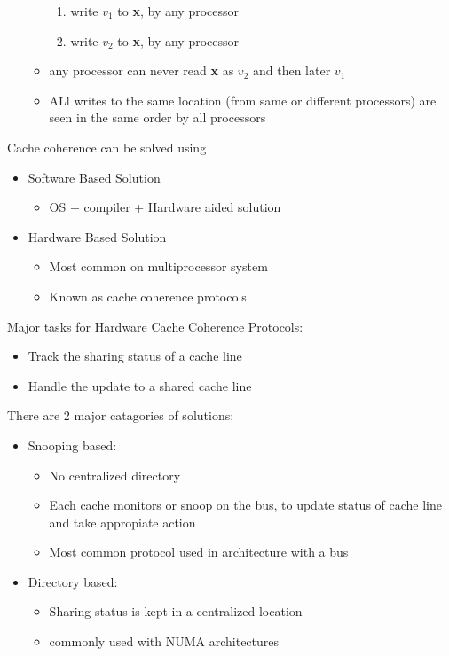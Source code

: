 \documentclass{article}
\begin{document}
\begin{itemize}
\begin{itemize}
\begin{enumerate}
                        \item write $v_1$ to \textbf{x}, by any processor
                        \item write $v_2$ to \textbf{x}, by any processor
                    \end{enumerate}
              \item any processor can never read \textbf{x} as $v_2$ and then later $v_1$
              \item ALl writes to the same location (from same or different processors) are seen in the same order by all processors
          \end{itemize}
\end{itemize}

Cache coherence can be solved using
\begin{itemize}
    \item Software Based Solution
          \begin{itemize}
              \item OS + compiler + Hardware aided solution
          \end{itemize}
    \item Hardware Based Solution
          \begin{itemize}
              \item Most common on multiprocessor system
              \item Known as cache coherence protocols
          \end{itemize}
\end{itemize}

Major tasks for Hardware Cache Coherence Protocols:
\begin{itemize}
    \item Track the sharing status of a cache line
    \item Handle the update to a shared cache line
\end{itemize}

There are 2 major catagories of solutions:
\begin{itemize}
    \item Snooping based:
          \begin{itemize}
              \item No centralized directory
              \item Each cache monitors or snoop on the bus, to update status  of cache line and take appropiate action
              \item Most common protocol used in architecture with a bus
          \end{itemize}
    \item Directory based:
          \begin{itemize}
              \item Sharing status is kept in a centralized location
              \item commonly used with NUMA architectures
          \end{itemize}
\end{itemize}
\end{document}
